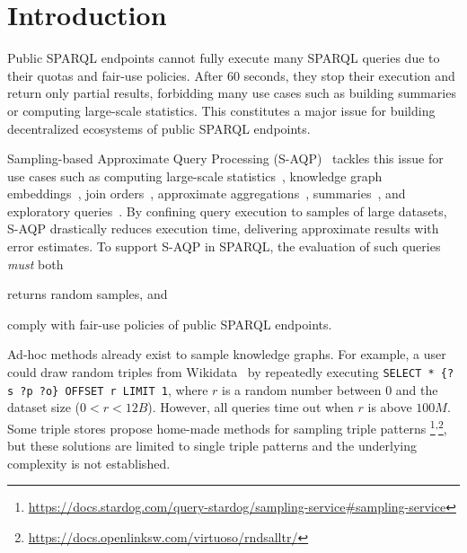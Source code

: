 
\section{Introduction}

Public SPARQL endpoints cannot fully execute many SPARQL queries due
to their quotas and fair-use policies. After 60 seconds, they stop
their execution and return only partial results, forbidding many use
cases such as building summaries or computing large-scale statistics.
This constitutes a major issue for building decentralized ecosystems
of public SPARQL endpoints.

Sampling-based Approximate Query Processing
(S-AQP)~\cite{DBLP:conf/sigmod/AgarwalMKTJMMS14} tackles this issue
for use cases such as computing large-scale
statistics~\cite{soulet2019anytime,10.1007/978-3-319-18818-8_14},
knowledge graph embeddings~\cite{ristoski2016rdf2vec}, join
orders~\cite{DBLP:conf/cidr/LeisRGK017}, approximate
aggregations~\cite{wang2022approximate},
summaries~\cite{10.1007/978-3-030-49461-2_10}, and exploratory
queries~\cite{DBLP:conf/sigmod/AgarwalMKTJMMS14}.  By confining query
execution to samples of large datasets, S-AQP drastically reduces
execution time, delivering approximate results with error estimates.
%
To support S-AQP in SPARQL, the evaluation of such queries \emph{must}
both
\begin{inparaenum}[(i)]
\item returns random samples, and
\item comply with fair-use policies of public SPARQL endpoints.
\end{inparaenum}
Ad-hoc methods already exist to sample knowledge graphs.  For example, a user could draw random triples from
Wikidata~\cite{soulet2019anytime} by repeatedly executing
\verb|SELECT * {?s ?p ?o} OFFSET r LIMIT 1|, where $r$ is a random
number between $0$ and the dataset size ($0<r<12B$). However, all
queries time out when $r$ is above $100M$.
Some triple stores propose home-made methods for sampling triple
patterns%
\footnote{\url{https://docs.stardog.com/query-stardog/sampling-service\#sampling-service}}\textsuperscript{,}\footnote{\url{https://docs.openlinksw.com/virtuoso/rndsalltr/}},
but these solutions are limited to single triple patterns and the
underlying complexity is not established.

